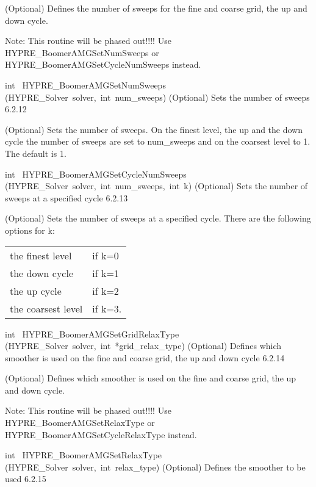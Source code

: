 \documentclass{article}
\begin{document}
\begin{cxxentry}
\begin{cxxentry}
\begin{cxxfunction}
\begin{cxxdoc}
(Optional) Defines the number of sweeps for the fine and coarse grid, 
the up and down cycle.

Note: This routine will be phased out!!!!
Use HYPRE\_BoomerAMGSetNumSweeps or HYPRE\_BoomerAMGSetCycleNumSweeps instead.
\end{cxxdoc}
\end{cxxfunction}
\begin{cxxfunction}
{int\ }
        {HYPRE\_BoomerAMGSetNumSweeps}
        {(HYPRE\_Solver\ solver,\ int\ num\_sweeps)}
        {
(Optional) Sets the number of sweeps}
        {6.2.12}
\begin{cxxdoc}

(Optional) Sets the number of sweeps. On the finest level, the up and 
the down cycle the number of sweeps are set to num\_sweeps and on the 
coarsest level to 1. The default is 1.
\end{cxxdoc}
\end{cxxfunction}
\begin{cxxfunction}
{int\ }
        {HYPRE\_BoomerAMGSetCycleNumSweeps}
        {(HYPRE\_Solver\ solver,\ int\ num\_sweeps,\ int\ k)}
        {
(Optional) Sets the number of sweeps at a specified cycle}
        {6.2.13}
\begin{cxxdoc}

(Optional) Sets the number of sweeps at a specified cycle.
There are the following options for k:

\begin{tabular}{|l|l|} \hline
the finest level &	if k=0 \\
the down cycle &	if k=1 \\
the up cycle	&	if k=2 \\
the coarsest level &  if k=3.\\
\hline
\end{tabular}
\end{cxxdoc}
\end{cxxfunction}
\begin{cxxfunction}
{int\ }
        {HYPRE\_BoomerAMGSetGridRelaxType}
        {(HYPRE\_Solver\ solver,\ int\ *grid\_relax\_type)}
        {
(Optional) Defines which smoother is used on the fine and coarse grid, 
the up and down cycle}
        {6.2.14}
\begin{cxxdoc}

(Optional) Defines which smoother is used on the fine and coarse grid, 
the up and down cycle.

Note: This routine will be phased out!!!!
Use HYPRE\_BoomerAMGSetRelaxType or HYPRE\_BoomerAMGSetCycleRelaxType instead.
\end{cxxdoc}
\end{cxxfunction}
\begin{cxxfunction}
{int\ }
        {HYPRE\_BoomerAMGSetRelaxType}
        {(HYPRE\_Solver\ solver,\ int\ relax\_type)}
        {
(Optional) Defines the smoother to be used}
        {6.2.15}
\begin{cxxdoc}


\end{cxxdoc}
\end{cxxfunction}
\end{cxxentry}
\end{cxxentry}
\end{document}
